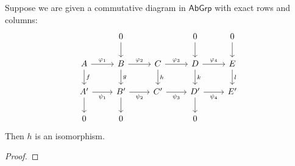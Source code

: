 \begin{proposition}
	Suppose we are given a commutative diagram in $\mathsf{AbGrp}$ with exact rows and columns:
	\begin{equation*}
		\begin{tikzcd}
			& 0\arrow[d] & & 0\arrow[d] & 0\arrow[d]\\
			A \arrow[d,"f"]\arrow[r,"\varphi_1"] & B \arrow[r,"\varphi_2"]\arrow[d,"g"] & C \arrow[r,"\varphi_3"]\arrow[d,"h"] & D \arrow[r,"\varphi_4"]\arrow[d,"k"] & E \arrow[d,"l"]\\
			A' \arrow[r,"\psi_1"']\arrow[d] & B' \arrow[r,"\psi_2"']\arrow[d] & C' \arrow[r,"\psi_3"'] & D' \arrow[r,"\psi_4"']\arrow[d] & E'\\
			0 & 0 & & 0
		\end{tikzcd}
	\end{equation*}
	Then $h$ is an isomorphism.
\end{proposition}

\begin{proof}
	
\end{proof}
